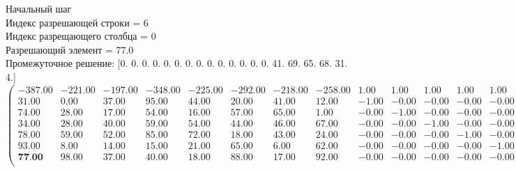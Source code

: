 \documentclass[draft]{article}
\begin{document}
\begin{flushleft}
    Начальный шаг\\
    Индекс разрешающей строки = 6\\
    Индекс разрещающего столбца = 0\\
    Разрешающий элемент = 77.0\\
    Промежуточное решение:
    [0.  0.  0.  0.  0.  0.  0.  0.  0.  0.  0.  0.  0.  0.  41.  69.  65.  68.  31.  4.]
\begin{equation*}
\begin{pmatrix}
   -387.00 & -221.00 & -197.00 & -348.00 & -225.00 & -292.00 & -218.00 & -258.00 &  1.00 &  1.00 &  1.00 &  1.00 &  1.00 &  1.00 & 0.00 & 0.00 & 0.00 & 0.00 & 0.00 & 0.00 & -278.00 \\
   31.00 &    0.00 &   37.00 &   95.00 &   44.00 &   20.00 &   41.00 &   12.00 & -1.00 & -0.00 & -0.00 & -0.00 & -0.00 & -0.00 & 1.00 & 0.00 & 0.00 & 0.00 & 0.00 & 0.00 &   41.00 \\
   74.00 &   28.00 &   17.00 &   54.00 &   16.00 &   57.00 &   65.00 &    1.00 & -0.00 & -1.00 & -0.00 & -0.00 & -0.00 & -0.00 & 0.00 & 1.00 & 0.00 & 0.00 & 0.00 & 0.00 &   69.00 \\
   34.00 &   28.00 &   40.00 &   59.00 &   54.00 &   44.00 &   46.00 &   67.00 & -0.00 & -0.00 & -1.00 & -0.00 & -0.00 & -0.00 & 0.00 & 0.00 & 1.00 & 0.00 & 0.00 & 0.00 &   65.00 \\
   78.00 &   59.00 &   52.00 &   85.00 &   72.00 &   18.00 &   43.00 &   24.00 & -0.00 & -0.00 & -0.00 & -1.00 & -0.00 & -0.00 & 0.00 & 0.00 & 0.00 & 1.00 & 0.00 & 0.00 &   68.00 \\
   93.00 &    8.00 &   14.00 &   15.00 &   21.00 &   65.00 &    6.00 &   62.00 & -0.00 & -0.00 & -0.00 & -0.00 & -1.00 & -0.00 & 0.00 & 0.00 & 0.00 & 0.00 & 1.00 & 0.00 &   31.00 \\
   \textbf{77.00} &   98.00 &   37.00 &   40.00 &   18.00 &   88.00 &   17.00 &   92.00 & -0.00 & -0.00 & -0.00 & -0.00 & -0.00 & -1.00 & 0.00 & 0.00 & 0.00 & 0.00 & 0.00 & 1.00 &    4.00 \\
\end{pmatrix}
\end{equation*}
\end{flushleft}
\end{document}
